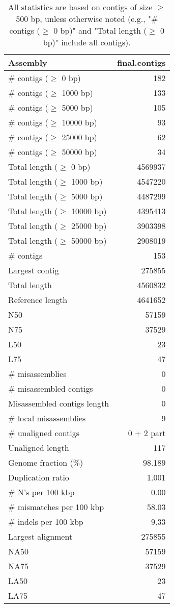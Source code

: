 \documentclass[12pt,a4paper]{article}
\begin{document}
\begin{table}[ht]
\begin{center}
\caption{All statistics are based on contigs of size $\geq$ 500 bp, unless otherwise noted (e.g., "\# contigs ($\geq$ 0 bp)" and "Total length ($\geq$ 0 bp)" include all contigs).}
\begin{tabular}{|l*{1}{|r}|}
\hline
Assembly & final.contigs \\ \hline
\# contigs ($\geq$ 0 bp) & 182 \\ \hline
\# contigs ($\geq$ 1000 bp) & 133 \\ \hline
\# contigs ($\geq$ 5000 bp) & 105 \\ \hline
\# contigs ($\geq$ 10000 bp) & 93 \\ \hline
\# contigs ($\geq$ 25000 bp) & 62 \\ \hline
\# contigs ($\geq$ 50000 bp) & 34 \\ \hline
Total length ($\geq$ 0 bp) & 4569937 \\ \hline
Total length ($\geq$ 1000 bp) & 4547220 \\ \hline
Total length ($\geq$ 5000 bp) & 4487299 \\ \hline
Total length ($\geq$ 10000 bp) & 4395413 \\ \hline
Total length ($\geq$ 25000 bp) & 3903398 \\ \hline
Total length ($\geq$ 50000 bp) & 2908019 \\ \hline
\# contigs & 153 \\ \hline
Largest contig & 275855 \\ \hline
Total length & 4560832 \\ \hline
Reference length & 4641652 \\ \hline
N50 & 57159 \\ \hline
N75 & 37529 \\ \hline
L50 & 23 \\ \hline
L75 & 47 \\ \hline
\# misassemblies & 0 \\ \hline
\# misassembled contigs & 0 \\ \hline
Misassembled contigs length & 0 \\ \hline
\# local misassemblies & 9 \\ \hline
\# unaligned contigs & 0 + 2 part \\ \hline
Unaligned length & 117 \\ \hline
Genome fraction (\%) & 98.189 \\ \hline
Duplication ratio & 1.001 \\ \hline
\# N's per 100 kbp & 0.00 \\ \hline
\# mismatches per 100 kbp & 58.03 \\ \hline
\# indels per 100 kbp & 9.33 \\ \hline
Largest alignment & 275855 \\ \hline
NA50 & 57159 \\ \hline
NA75 & 37529 \\ \hline
LA50 & 23 \\ \hline
LA75 & 47 \\ \hline
\end{tabular}
\end{center}
\end{table}
\end{document}

